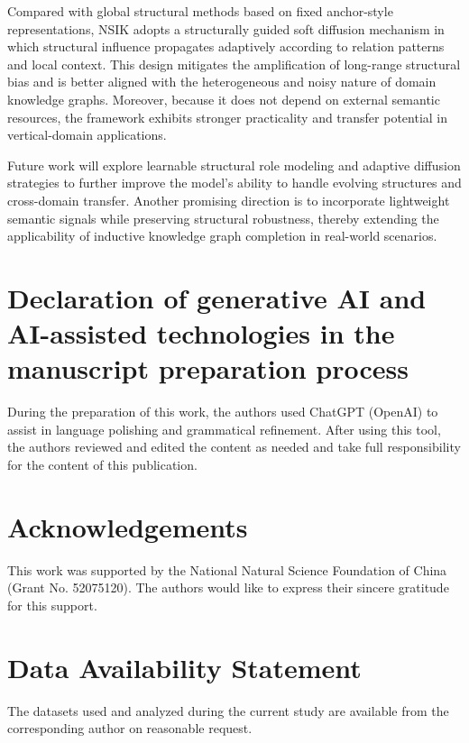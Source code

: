 \documentclass[preprint,12pt]{elsarticle}
\begin{document}
Compared with global structural methods based on fixed anchor-style representations, NSIK adopts a structurally guided soft diffusion mechanism in which structural influence propagates adaptively according to relation patterns and local context. This design mitigates the amplification of long-range structural bias and is better aligned with the heterogeneous and noisy nature of domain knowledge graphs. Moreover, because it does not depend on external semantic resources, the framework exhibits stronger practicality and transfer potential in vertical-domain applications.


Future work will explore learnable structural role modeling and adaptive diffusion strategies to further improve the model’s ability to handle evolving structures and cross-domain transfer. Another promising direction is to incorporate lightweight semantic signals while preserving structural robustness, thereby extending the applicability of inductive knowledge graph completion in real-world scenarios.

\section*{Declaration of generative AI and AI-assisted technologies in the manuscript preparation process}

During the preparation of this work, the authors used ChatGPT (OpenAI) to assist in language polishing and grammatical refinement. After using this tool, the authors reviewed and edited the content as needed and take full responsibility for the content of this publication.

\section*{Acknowledgements}

This work was supported by the National Natural Science Foundation of China (Grant No. 52075120). The authors would like to express their sincere gratitude for this support.

\section*{Data Availability Statement}

The datasets used and analyzed during the current study are available from the corresponding author on reasonable request.
\end{document}
